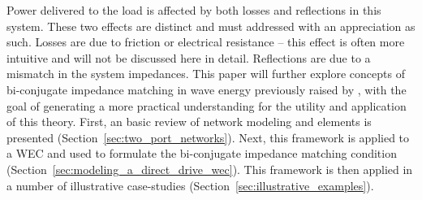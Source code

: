 \documentclass[lettersize,journal]{IEEEtran}
\begin{document}
Power delivered to the load is affected by both losses and reflections in this system.
These two effects are distinct and must addressed with an appreciation as such.
Losses are due to friction or electrical resistance -- this effect is often more intuitive and will not be discussed here in detail.
Reflections are due to a mismatch in the system impedances.
This paper will further explore concepts of bi-conjugate impedance matching in wave energy previously raised by \cite{Bacelli:2021aa}, with the goal of generating a more practical understanding for the utility and application of this theory.
First, an basic review of network modeling and elements is presented (Section~\ref{sec:two_port_networks}).
Next, this framework is applied to a WEC and used to formulate the bi-conjugate impedance matching condition (Section~\ref{sec:modeling_a_direct_drive_wec}).
This framework is then applied in a number of illustrative case-studies (Section~\ref{sec:illustrative_examples}).




\end{document}
